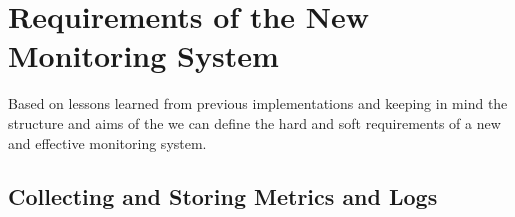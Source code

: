 %

\chapter{Requirements of the New Monitoring System \label{ch2}}

Based on lessons learned from previous implementations and keeping in mind the
structure and aims of the \kszkfull we can define the hard and soft
requirements of a new and effective monitoring system.

\section{Collecting and Storing Metrics and Logs}

